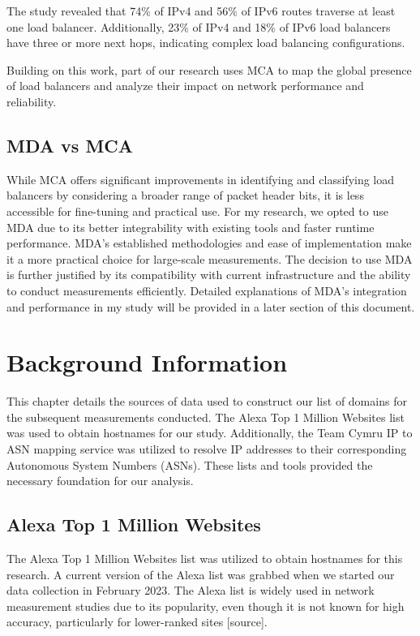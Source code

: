 \documentclass[12pt]{cwru_thesis}
\begin{document}
The study revealed that 74\% of IPv4 and 56\% of IPv6 routes traverse at least one load balancer. Additionally, 23\% of IPv4 and 18\% of IPv6 load balancers have three or more next hops, indicating complex load balancing configurations.

Building on this work, part of our research uses MCA to map the global presence of load balancers and analyze their impact on network performance and reliability. 

\section{MDA vs MCA}
While MCA offers significant improvements in identifying and classifying load balancers by considering a broader range of packet header bits, it is less accessible for fine-tuning and practical use. For my research, we opted to use MDA due to its better integrability with existing tools and faster runtime performance. MDA's established methodologies and ease of implementation make it a more practical choice for large-scale measurements. The decision to use MDA is further justified by its compatibility with current infrastructure and the ability to conduct measurements efficiently. Detailed explanations of MDA's integration and performance in my study will be provided in a later section of this document.



\chapter{Background Information }

This chapter details the sources of data used to construct our list of domains for the subsequent measurements conducted. The Alexa Top 1 Million Websites list was used to obtain hostnames for our study.
Additionally, the Team Cymru IP to ASN mapping service was utilized to resolve IP addresses to their corresponding Autonomous System Numbers (ASNs). These lists and tools provided the necessary foundation for our analysis.

\section{Alexa Top 1 Million Websites}

The Alexa Top 1 Million Websites list was utilized to obtain hostnames for this research. A current version of the Alexa list was grabbed when we started our data collection in February 2023. The Alexa list is widely used in network measurement studies due to its popularity, even though it is not known for high accuracy, particularly for lower-ranked sites [source].
\end{document}
